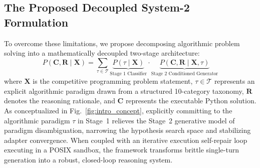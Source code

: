 \documentclass{ieeeaccess}
\begin{document}
\subsection{The Proposed Decoupled System-2 Formulation}
To overcome these limitations, we propose decomposing algorithmic problem solving into a mathematically decoupled two-stage architecture:
\begin{equation}
\label{eq:decoupled_intro}
P(\mathbf{C}, \mathbf{R} \mid \mathbf{X}) = \sum_{\tau \in \mathcal{T}} \underbrace{P(\tau \mid \mathbf{X})}_{\text{Stage 1 Classifier}} \cdot \underbrace{P(\mathbf{C}, \mathbf{R} \mid \mathbf{X}, \tau)}_{\text{Stage 2 Conditioned Generator}}
\end{equation}
where $\mathbf{X}$ is the competitive programming problem statement, $\tau \in \mathcal{T}$ represents an explicit algorithmic paradigm drawn from a structured 10-category taxonomy, $\mathbf{R}$ denotes the reasoning rationale, and $\mathbf{C}$ represents the executable Python solution. As conceptualized in Fig.~\ref{fig:intro_concept}, explicitly committing to the algorithmic paradigm $\tau$ in Stage~1 relieves the Stage~2 generative model of paradigm disambiguation, narrowing the hypothesis search space and stabilizing adapter convergence. When coupled with an iterative execution self-repair loop executing in a POSIX sandbox, the framework transforms brittle single-turn generation into a robust, closed-loop reasoning system.
\end{document}
